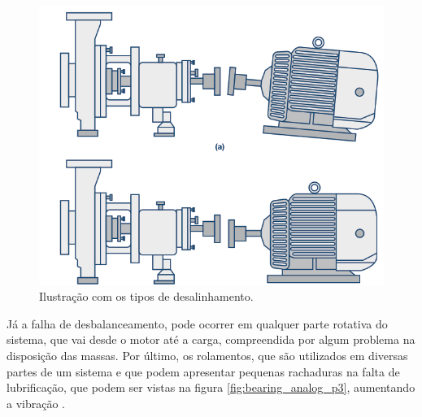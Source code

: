 \begin{figure}[H]
    \caption{Ilustração com os tipos de desalinhamento.}
    \begin{center}
        \includegraphics[scale=.35]{referencial/img/misadraw_analog_p2.png}
    \end{center}
    \label{fig:misadraw_analog_p2}
\end{figure}

Já a falha de desbalanceamento, pode ocorrer em qualquer parte rotativa do sistema, que vai desde o motor até a carga, compreendida por
algum problema na disposição das massas. Por último, os rolamentos, que são utilizados em diversas partes de um sistema e que podem
apresentar pequenas rachaduras na falta de lubrificação, que podem ser vistas na figura \ref{fig:bearing_analog_p3}, aumentando a 
vibração \cite{Sopcik2019}.

